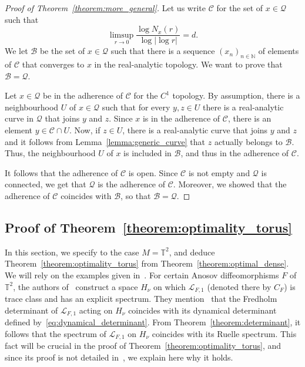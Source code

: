 \documentclass[10pt]{amsart}
\theoremstyle{definition}\newtheorem{defi}[theo]{Definition}\newtheorem{rema}[theo]{Remark}\newtheorem{exam}[theo]{Example}\newtheorem{exem}[theo]{Example}\newtheorem{nota}[theo]{Notation}
\newcommand{\clL}{\mathcal{L}}
\newcommand{\clB}{\mathcal{B}}
\newcommand{\clQ}{\mathcal{Q}}
\newcommand{\clC}{\mathcal{C}}
\newcommand{\bbT}{\mathbb{T}}
\newcommand{\bbN}{\mathbb{N}}
\begin{document}
\begin{proof}[Proof of Theorem~\ref{theorem:more_general}]
Let us write $\clC$ for the set of $x \in \clQ$ such that
\begin{equation*}
\limsup_{r \to 0} \frac{\log N_{x}(r)}{\log |\log r|} = d.
\end{equation*}
We let $\clB$ be the set of $x \in \clQ$ such that there is a sequence $(x_n)_{n \in \bbN}$ of elements of $\clC$ that converges to $x$ in the real-analytic topology. We want to prove that $\clB = \clQ$.

Let $x \in \clQ$ be in the adherence of $\clC$ for the $C^1$ topology. By assumption, there is a neighbourhood $U$ of $x \in \clQ$ such that for every $y,z \in U$ there is a real-analytic curve in $\clQ$ that joins $y$ and $z$. Since $x$ is in the adherence of $\clC$, there is an element $y \in \clC \cap U$. Now, if $z \in U$, there is a real-analytic curve that joins $y$ and $z$ and it follows from Lemma~\ref{lemma:generic_curve} that $z$ actually belongs to $\clB$. Thus, the neighbourhood $U$ of $x$ is included in $\clB$, and thus in the adherence of $\clC$.

It follows that the adherence of $\clC$ is open. Since $\clC$ is not empty and $\clQ$ is connected, we get that $\clQ$ is the adherence of $\clC$. Moreover, we showed that the adherence of $\clC$ coincides with $\clB$, so that $\clB = \clQ$.
\end{proof}

\subsection{Proof of Theorem~\ref{theorem:optimality_torus}}\label{subsection:optimality_torus}

In this section, we specify to the case $M = \bbT^2$, and deduce Theorem~\ref{theorem:optimality_torus} from Theorem~\ref{theorem:optimal_dense}. We will rely on the examples given in~\cite{optimal_examples}. For certain Anosov diffeomorphisms $F$ of $\bbT^2$, the authors of~\cite{optimal_examples} construct a space $H_\nu$ on which $\clL_{F,1}$ (denoted there by $C_F$) is trace class and has an explicit spectrum. They mention~\cite[Remark~1.4]{optimal_examples} that the Fredholm determinant of $\clL_{F,1}$ acting on $H_\nu$ coincides with its dynamical determinant defined by~\eqref{eq:dynamical_determinant}. From Theorem~\ref{theorem:determinant}, it follows that the spectrum of $\clL_{F,1}$ on $H_\nu$ coincides with its Ruelle spectrum. This fact will be crucial in the proof of Theorem~\ref{theorem:optimality_torus}, and since its proof is not detailed in~\cite{optimal_examples}, we explain here why it holds.
\end{document}
